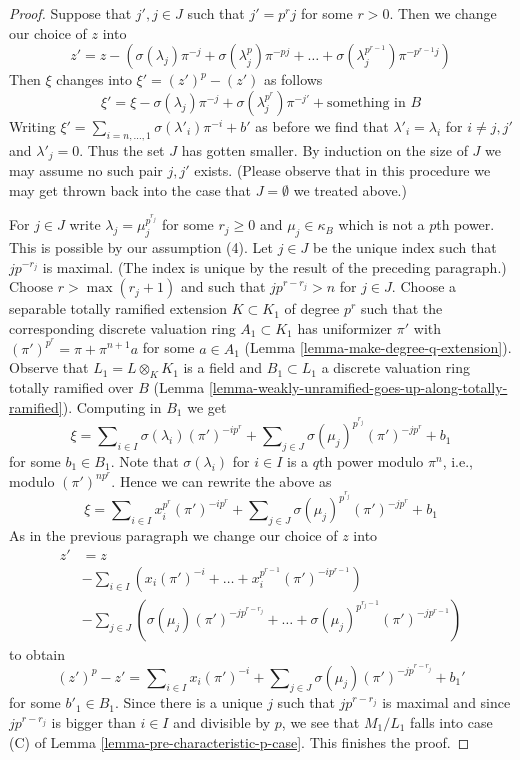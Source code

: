 \begin{proof}
\medskip\noindent
Suppose that $j', j \in J$ such that $j' = p^r j$ for some
$r > 0$. Then we change our choice of $z$ into
$$
z' = z -
(\sigma(\lambda_j) \pi^{-j} + \sigma(\lambda_j^p) \pi^{-pj} + \ldots +
\sigma(\lambda_j^{p^{r - 1}}) \pi^{-p^{r - 1}j})
$$
Then $\xi$ changes into $\xi' = (z')^p - (z')$ as follows
$$
\xi' =
\xi - \sigma(\lambda_j) \pi^{-j} + \sigma(\lambda_j^{p^r}) \pi^{-j'}
+ \text{something in }B
$$
Writing
$\xi' = \sum\nolimits_{i = n, \ldots, 1} \sigma(\lambda'_i) \pi^{-i} + b'$
as before we find that
$\lambda'_i = \lambda_i$ for $i \not = j, j'$ and $\lambda'_j = 0$.
Thus the set $J$ has gotten smaller.
By induction on the size of $J$ we may assume no such pair $j, j'$ exists.
(Please observe that in this procedure we may get thrown back into the case
that $J = \emptyset$ we treated above.)

\medskip\noindent
For $j \in J$ write $\lambda_j = \mu_j^{p^{r_j}}$ for some $r_j \geq 0$ and
$\mu_j \in \kappa_B$ which is not a $p$th power. This is possible by our
assumption (4). Let $j \in J$ be the unique index such that $j p^{-r_j}$
is maximal. (The index is unique by the result of the preceding paragraph.)
Choose $r > \max(r_j + 1)$ and such that $j p^{r - r_j} > n$ for $j \in J$.
Choose a separable totally ramified extension $K \subset K_1$
of degree $p^r$ such that the corresponding discrete valuation ring
$A_1 \subset K_1$ has uniformizer $\pi'$ with
$(\pi')^{p^r} = \pi + \pi^{n + 1}a$ for some $a \in A_1$
(Lemma \ref{lemma-make-degree-q-extension}).
Observe that $L_1 = L \otimes_K K_1$ is a field and $B_1 \subset L_1$
a discrete valuation ring totally ramified over $B$
(Lemma \ref{lemma-weakly-unramified-goes-up-along-totally-ramified}).
Computing in $B_1$ we get
$$
\xi = \sum\nolimits_{i \in I} \sigma(\lambda_i) (\pi')^{-i p^r} +
\sum\nolimits_{j \in J} \sigma(\mu_j)^{p^{r_j}} (\pi')^{-j p^r} + b_1
$$
for some $b_1 \in B_1$. Note that $\sigma(\lambda_i)$ for $i \in I$
is a $q$th power modulo $\pi^n$, i.e., modulo $(\pi')^{n p^r}$.
Hence we can rewrite the above as
$$
\xi = \sum\nolimits_{i \in I} x_i^{p^r} (\pi')^{-i p^r} +
\sum\nolimits_{j \in J} \sigma(\mu_j)^{p^{r_j}} (\pi')^{- j p^r}
+ b_1
$$
As in the previous paragraph we change our choice of $z$ into
\begin{align*}
z' & = z \\
& -
\sum\nolimits_{i \in I}
\left(x_i (\pi')^{-i} + \ldots + x_i^{p^{r - 1}} (\pi')^{-i p^{r - 1}}\right)
\\
& -
\sum\nolimits_{j \in J}
\left(
\sigma(\mu_j) (\pi')^{- j p^{r - r_j}}
+ \ldots +
\sigma(\mu_j)^{p^{r_j - 1}} (\pi')^{- j p^{r - 1}}
\right)
\end{align*}
to obtain
$$
(z')^p - z' =
\sum\nolimits_{i \in I} x_i (\pi')^{-i} +
\sum\nolimits_{j \in J} \sigma(\mu_j) (\pi')^{- j p^{r - r_j}} + b_1'
$$
for some $b'_1 \in B_1$.
Since there is a unique $j$ such that $j p^{r - r_j}$ is maximal
and since $j p^{r - r_j}$ is bigger than $i \in I$ and divisible
by $p$, we see that $M_1 / L_1$ falls into case (C) of
Lemma \ref{lemma-pre-characteristic-p-case}.
This finishes the proof.
\end{proof}

